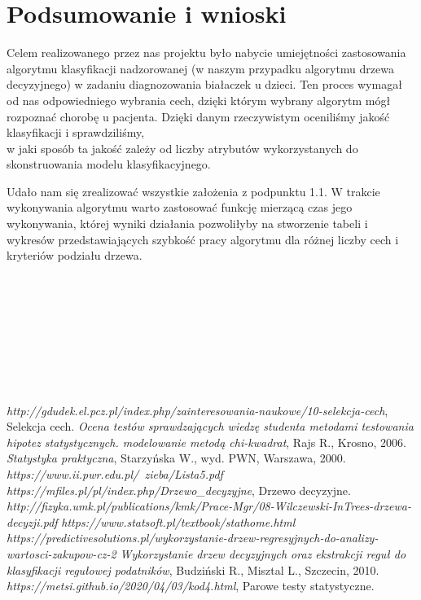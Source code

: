 \documentclass{article}
\begin{document}
\section{Podsumowanie i wnioski}
\quad Celem realizowanego przez nas projektu było nabycie umiejętności zastosowania algorytmu klasyfikacji nadzorowanej (w naszym przypadku algorytmu drzewa decyzyjnego) w zadaniu diagnozowania białaczek u dzieci. Ten proces wymagał od nas odpowiedniego wybrania cech, dzięki którym wybrany algorytm mógł rozpoznać chorobę u pacjenta. Dzięki danym rzeczywistym oceniliśmy jakość klasyfikacji i sprawdziliśmy, \\w jaki sposób ta jakość zależy od liczby atrybutów wykorzystanych do skonstruowania modelu klasyfikacyjnego. 

Udało nam się zrealizować wszystkie założenia z podpunktu 1.1. W trakcie wykonywania algorytmu warto zastosować funkcję mierzącą czas jego wykonywania, której wyniki działania pozwoliłyby na stworzenie tabeli i wykresów przedstawiających szybkość pracy algorytmu dla różnej liczby cech i kryteriów podziału drzewa.\\\\\\\\\\\\\\\\\\


\begin{thebibliography}{}
\textit{http://gdudek.el.pcz.pl/index.php/zainteresowania-naukowe/10-selekcja-cech}, Selekcja cech.
\textit{Ocena testów sprawdzających wiedzę studenta metodami testowania hipotez statystycznych. modelowanie metodą chi-kwadrat}, Rajs R., Krosno, 2006.
\textit{Statystyka praktyczna}, Starzyńska W., wyd. PWN, Warszawa, 2000.
\textit{https://www.ii.pwr.edu.pl/~zieba/Lista5.pdf}
\textit{https://mfiles.pl/pl/index.php/Drzewo\_decyzyjne}, Drzewo decyzyjne.
\textit{http://fizyka.umk.pl/publications/kmk/Prace-Mgr/08-Wilczewski-InTrees-drzewa-decyzji.pdf}
\textit{https://www.statsoft.pl/textbook/stathome.html}
\textit{https://predictivesolutions.pl/wykorzystanie-drzew-regresyjnych-do-analizy-wartosci-zakupow-cz-2}
\textit{Wykorzystanie drzew decyzyjnych oraz ekstrakcji reguł
do klasyfikacji regułowej podatników}, Budziński R., Misztal L., Szczecin, 2010.
\textit{https://metsi.github.io/2020/04/03/kod4.html}, Parowe testy statystyczne.
\end{thebibliography}
\end{document}
